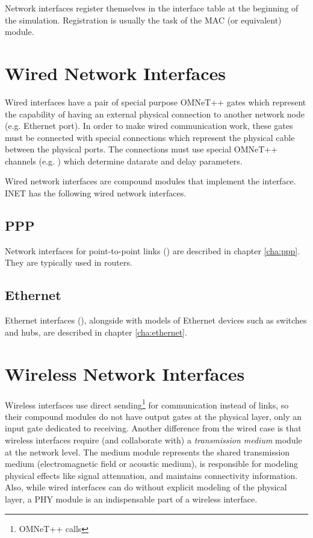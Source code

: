 Network interfaces register themselves in the interface table at the
beginning of the simulation. Registration is usually the task of the
MAC (or equivalent) module.


\section{Wired Network Interfaces}
\label{sec:interfaces:wired-network-interfaces}

Wired interfaces have a pair of special purpose OMNeT++ gates which represent
the capability of having an external physical connection to another network
node (e.g. Ethernet port). In order to make wired communication work,
these gates must be connected with special connections which represent the
physical cable between the physical ports. The connections must use special
OMNeT++ channels (e.g. ) which determine datarate
and delay parameters.

Wired network interfaces are compound modules that implement the
 interface. INET has the following
wired network interfaces.

\subsection{PPP}
\label{sec:interfaces:ppp}

Network interfaces for point-to-point links () are
described in chapter \ref{cha:ppp}. They are typically used in routers.

\subsection{Ethernet}
\label{sec:interfaces:ethernet}

Ethernet interfaces (), alongside with models
of Ethernet devices such as switches and hubs, are described in chapter
\ref{cha:ethernet}.

\section{Wireless Network Interfaces}
\label{sec:interfaces:wireless-network-interfaces}

Wireless interfaces use direct sending\footnote{OMNeT++  calls}
for communication instead of links, so their compound modules do not have
output gates at the physical layer, only an input gate dedicated to receiving.
Another difference from the wired case is that wireless interfaces
require (and collaborate with) a \textit{transmission medium} module
at the network level. The medium module represents the shared transmission
medium (electromagnetic field or acoustic medium), is responsible for
modeling physical effects like signal attenuation, and maintains
connectivity information. Also, while wired interfaces can do without
explicit modeling of the physical layer, a PHY module is an indispensable
part of a wireless interface.

